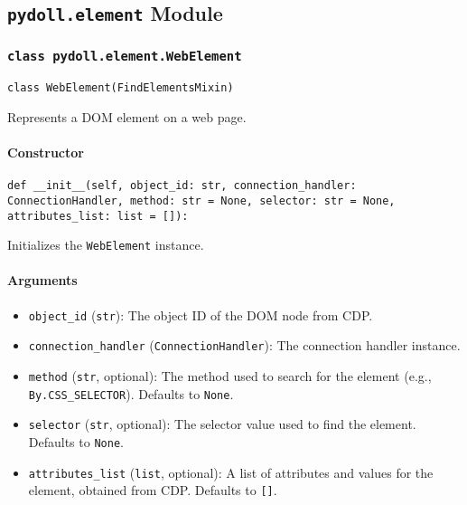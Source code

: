 \documentclass{article}
\begin{document}
\hrulefill

\subsection*{\texttt{pydoll.element} Module}

\subsubsection*{\texttt{class pydoll.element.WebElement}}
\noindent\texttt{class WebElement(FindElementsMixin)}

\noindent Represents a DOM element on a web page.

\paragraph{Constructor}

\begin{lstlisting}[style=pythonstyle]
def __init__(self, object_id: str, connection_handler: ConnectionHandler, method: str = None, selector: str = None, attributes_list: list = []):
\end{lstlisting}

\noindent Initializes the \lstinline[style=pythonstyle]|WebElement| instance.

\paragraph{Arguments}

\begin{itemize}
    \item \lstinline[style=pythonstyle]|object_id| (\lstinline[style=pythonstyle]|str|): The object ID of the DOM node from CDP.
    \item \lstinline[style=pythonstyle]|connection_handler| (\lstinline[style=pythonstyle]|ConnectionHandler|): The connection handler instance.
    \item \lstinline[style=pythonstyle]|method| (\lstinline[style=pythonstyle]|str|, optional): The method used to search for the element (e.g., \lstinline[style=pythonstyle]|By.CSS_SELECTOR|). Defaults to \lstinline[style=pythonstyle]|None|.
    \item \lstinline[style=pythonstyle]|selector| (\lstinline[style=pythonstyle]|str|, optional): The selector value used to find the element. Defaults to \lstinline[style=pythonstyle]|None|.
    \item \lstinline[style=pythonstyle]|attributes_list| (\lstinline[style=pythonstyle]|list|, optional): A list of attributes and values for the element, obtained from CDP\@. Defaults to \lstinline[style=pythonstyle]|[]|.
\end{itemize}
\end{document}
